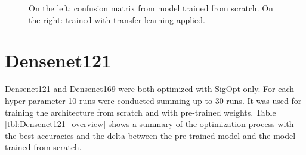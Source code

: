 \begin{figure}[!h]
\centering
\caption{On the left: confusion matrix from model trained from scratch. On the right: trained with transfer learning applied.}
\label{fig:resnet18-cm}
\end{figure}

\quad












\section{Densenet121}

Densenet121 and Densenet169 were both optimized with SigOpt only. For each hyper parameter 10 runs were conducted summing up to 30 runs. It was used for training the architecture from scratch and with pre-trained weights. Table \ref{tbl:Densenet121_overview} shows a summary of the optimization process with the best accuracies and the delta between the pre-trained model and the model trained from scratch.\\


